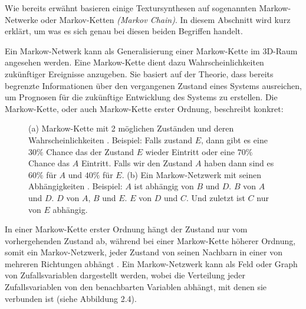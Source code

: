 \documentclass[12pt, a4paper,twoside,openany]{report} %
\begin{document}
Wie bereits erwähnt basieren einige Textursynthesen auf sogenannten Markow-Netwerke oder Markov-Ketten \textit{(Markov Chain)}.
In diesem Abschnitt wird kurz erklärt, um was es sich genau bei diesen beiden Begriffen handelt.\par
Ein Markow-Netwerk kann als Generalisierung einer Markow-Kette im 3D-Raum angesehen werden.
Eine Markow-Kette dient dazu Wahrscheinlichkeiten zukünftiger Ereignisse anzugeben.
Sie basiert auf der Theorie, dass bereits begrenzte Informationen über den vergangenen Zustand eines Systems ausreichen,
um Prognosen für die zukünftige Entwicklung des Systems zu erstellen.
Die Markow-Kette, oder auch Markow-Kette erster Ordnung, beschreibt konkret:
 \cite{wiki:Markow-Kette}

\begin{figure}[H]
    \centering
    \qquad
    \caption{(a) Markow-Kette mit 2 möglichen Zuständen und deren Wahrscheinlichkeiten \cite{wiki:Markow-Kette}.
    Beispiel: Falls zustand $E$, dann gibt es eine $30\%$ Chance das der Zustand $E$ wieder Eintritt oder eine $70\%$ Chance das $A$ Eintritt.
    Falls wir den Zustand $A$ haben dann sind es $60\%$ für $A$ und $40\%$ für $E$. (b) Ein Markow-Netzwerk mit seinen Abhängigkeiten \cite{wiki:Markov_model}.
    Beispiel: $A$ ist abhängig von $B$ und $D$. $B$ von $A$ und $D$. $D$ von $A$, $B$ und $E$. $E$ von $D$ und $C$. Und zuletzt ist $C$ nur von $E$ abhängig.}%
\end{figure}

In einer Markow-Kette erster Ordnung hängt der Zustand nur vom vorhergehenden Zustand ab,
während bei einer Markow-Kette höherer Ordnung, somit ein Markov-Netzwerk, jeder Zustand von seinen Nachbarn in einer von mehreren Richtungen abhängt \cite{wiki:Markov_model}.
Ein Markow-Netzwerk kann als Feld oder Graph von Zufallsvariablen dargestellt werden,
wobei die Verteilung jeder Zufallsvariablen von den benachbarten Variablen abhängt, mit denen sie verbunden ist {(siehe Abbildung 2.4)}.
\end{document}
